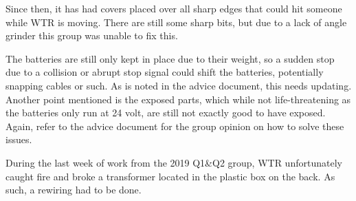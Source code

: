 Since then, it has had covers placed over all sharp edges that could hit someone while WTR is moving.
There are still some sharp bits, but due to a lack of angle grinder this group was unable to fix this.

The batteries are still only kept in place due to their weight, so a sudden stop due to a collision or abrupt stop signal could shift the batteries, potentially snapping cables or such.
As is noted in the advice document, this needs updating.
Another point mentioned is the exposed parts, which while not life-threatening as the batteries only run at 24 volt, are still not exactly good to have exposed.
Again, refer to the advice document for the group opinion on how to solve these issues.

During the last week of work from the 2019 Q1\&Q2 group, WTR unfortunately caught fire and broke a transformer located in the plastic box on the back.
As such, a rewiring had to be done.

\newpage

